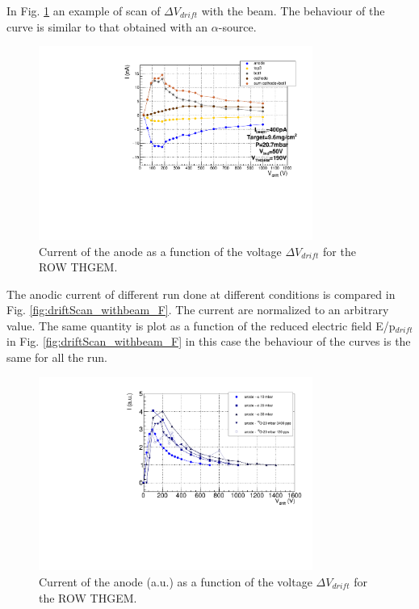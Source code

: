 \documentclass[a4paper, 11 pt]{report}
\newcommand{\Vdrift}{$ \Delta V_{drift}$}
\newcommand{\Edrift}{E/p$_{drift}$}
\begin{document}
  In Fig. \ref{fig:driftScan_ROW_beam} an example of scan of \Vdrift{} with the beam.
  The behaviour of the curve is similar to that obtained with an $\alpha$-source.
  \begin{figure}[htbp]
	\centering
	\includegraphics[width=0.8\textwidth]
	{Immagini/driftScan_ROW_THGEM_20mbar-Ibeam400pA-2020-03-10_2.pdf}
	\caption{Current of the anode as a function of the voltage \Vdrift{} for the ROW
	THGEM.}
	\label{fig:driftScan_ROW_beam}
  \end{figure}
  The anodic current of different run done at different conditions is compared in Fig. 
  \ref{fig:driftScan_withbeam_F}. The current are normalized to an arbitrary value. 
  The same quantity is plot as a function of the reduced electric field \Edrift{} in Fig.
  \ref{fig:driftScan_withbeam_F} in this case the behaviour of the curves is the same for 
  all the run. 
  \begin{figure}[htbp]
	\centering
	\includegraphics[width=0.8\textwidth]{Immagini/driftScan_ROW_THGEM_comp.pdf}
	\caption{Current of the anode (a.u.) as a function of the voltage \Vdrift{} for the ROW
	THGEM. }
	\label{fig:driftScan_withbeam}
  \end{figure}
  
\end{document}
